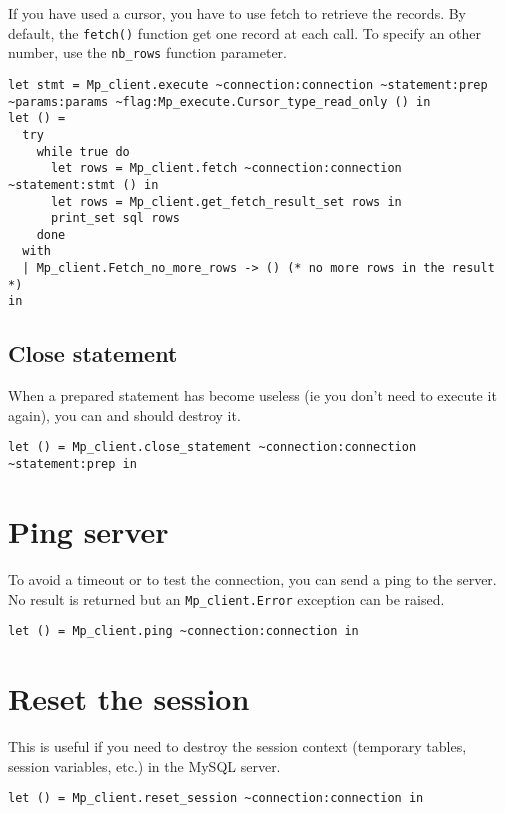 \documentclass[a4paper, english, 11pt]{article}
\begin{document}
If you have used a cursor, you have to use fetch to retrieve the records. By default, the \texttt{fetch()} function get one record at each call. To specify an other number, use the \texttt{nb\_rows} function parameter.

\begin{lstlisting}
let stmt = Mp_client.execute ~connection:connection ~statement:prep ~params:params ~flag:Mp_execute.Cursor_type_read_only () in
let () = 
  try
    while true do
      let rows = Mp_client.fetch ~connection:connection ~statement:stmt () in
      let rows = Mp_client.get_fetch_result_set rows in
      print_set sql rows
    done
  with
  | Mp_client.Fetch_no_more_rows -> () (* no more rows in the result *)
in
\end{lstlisting}

\subsection{Close statement}

When a prepared statement has become useless (ie you don't need to execute it again), you can and should destroy it.

\begin{lstlisting}
let () = Mp_client.close_statement ~connection:connection ~statement:prep in
\end{lstlisting}

\section{Ping server}

To avoid a timeout or to test the connection, you can send a ping to the server. No result is returned but an \texttt{Mp\_client.Error} exception can be raised.

\begin{lstlisting}
let () = Mp_client.ping ~connection:connection in
\end{lstlisting}

\section{Reset the session}

This is useful if you need to destroy the session context (temporary tables, session variables, etc.) in the MySQL server.

\begin{lstlisting}
let () = Mp_client.reset_session ~connection:connection in
\end{lstlisting}
\end{document}
